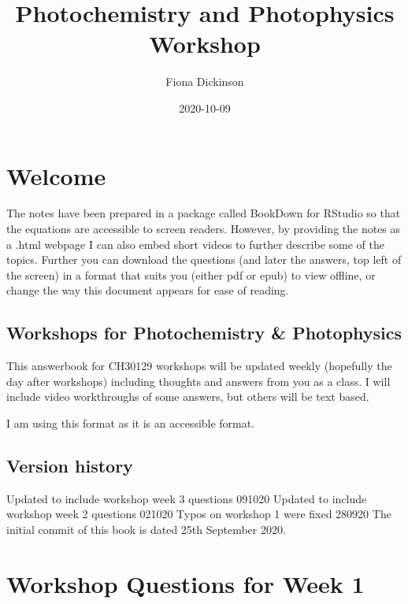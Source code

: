 \documentclass[
]{book}
\title{Photochemistry and Photophysics Workshop}
\author{Fiona Dickinson}
\date{2020-10-09}
\begin{document}
\maketitle

{
\setcounter{tocdepth}{1}
\tableofcontents
}
\hypertarget{welcome}{%
\chapter*{Welcome}\label{welcome}}

The notes have been prepared in a package called BookDown for RStudio so that the equations are accessible to screen readers. However, by providing the notes as a .html webpage I can also embed short videos to further describe some of the topics. Further you can download the questions (and later the answers, top left of the screen) in a format that suits you (either pdf or epub) to view offline, or change the way this document appears for ease of reading.

\hypertarget{workshops-for-photochemistry-photophysics}{%
\section*{Workshops for Photochemistry \& Photophysics}\label{workshops-for-photochemistry-photophysics}}

This answerbook for CH30129 workshops will be updated weekly (hopefully the day after workshops) including thoughts and answers from you as a class. I will include video workthroughs of some answers, but others will be text based.

I am using this format as it is an accessible format.

\hypertarget{version-history}{%
\section*{Version history}\label{version-history}}

Updated to include workshop week 3 questions 091020
Updated to include workshop week 2 questions 021020
Typos on workshop 1 were fixed 280920
The initial commit of this book is dated 25th September 2020.

\hypertarget{ch:Workshop1}{%
\chapter{Workshop Questions for Week 1}\label{ch:Workshop1}}
\end{document}
